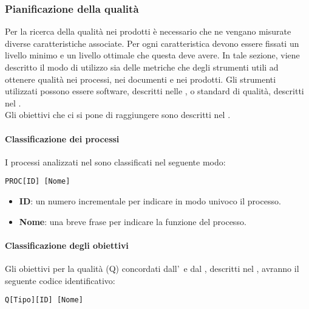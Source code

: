 		\subsubsection{Pianificazione della qualità}\label{Pianificazione qualita}
		Per la ricerca della qualità nei prodotti è necessario che ne vengano misurate diverse caratteristiche associate.
		Per ogni caratteristica devono essere fissati un livello minimo e un livello ottimale che questa deve avere.
		In tale sezione, viene descritto il modo di utilizzo sia delle metriche che degli strumenti utili ad ottenere qualità nei processi, nei documenti e nei prodotti.
		Gli strumenti utilizzati possono essere software, descritti nelle \Doc{\NdPv}, o standard di qualità, descritti nel \Doc{\PdQv}.\\
		Gli obiettivi che ci si pone di raggiungere sono descritti nel \Doc{\PdQv}.

			\paragraph{Classificazione dei processi}
			I processi analizzati nel \Doc{\PdQv} sono classificati nel seguente modo:

			\begin{center}
				\texttt{PROC[ID] [Nome]}
			\end{center}

			\begin{itemize}
				\item \textbf{ID}: un numero incrementale per indicare in modo univoco il processo.
				\item \textbf{Nome}: una breve frase per indicare la funzione del processo.
			\end{itemize}

			\paragraph{Classificazione degli obiettivi}
			Gli obiettivi per la qualità (Q) concordati dall'\Amm\ e dal \Ver, descritti nel \PdQ, avranno il seguente codice identificativo:

			\begin{center}
				\texttt{Q[Tipo][ID] [Nome]}
			\end{center}

